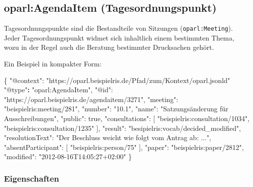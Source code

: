 \documentclass[,a4paper]{article}
\newenvironment{Shaded}{}{}
\newcommand{\DataTypeTok}[1]{\textcolor[rgb]{0.56,0.13,0.00}{{#1}}}
\newcommand{\DecValTok}[1]{\textcolor[rgb]{0.25,0.63,0.44}{{#1}}}
\newcommand{\StringTok}[1]{\textcolor[rgb]{0.25,0.44,0.63}{{#1}}}
\newcommand{\ErrorTok}[1]{\textcolor[rgb]{1.00,0.00,0.00}{\textbf{{#1}}}}
\newcommand{\NormalTok}[1]{{#1}}
\begin{document}
\subsection{oparl:AgendaItem
(Tagesordnungspunkt)}\label{oparlux5fagendaitem}

Tagesordnungspunkte sind die Bestandteile von Sitzungen
(\texttt{oparl:Meeting}). Jeder Tagesordnungspunkt widmet sich
inhaltlich einem bestimmten Thema, wozu in der Regel auch die Beratung
bestimmter Drucksachen gehört.

Ein Beispiel in kompakter Form:

\begin{Shaded}
\begin{Highlighting}[]
\NormalTok{\{}
    \DataTypeTok{"@context"}\NormalTok{: }\StringTok{"https://oparl.beispielris.de/Pfad/zum/Kontext/oparl.jsonld"}
    \StringTok{"@type"}\ErrorTok{:} \StringTok{"oparl:AgendaItem"}\NormalTok{,}
    \DataTypeTok{"@id"}\NormalTok{: }\StringTok{"https://oparl.beispielris.de/agendaitem/3271"}\NormalTok{,}
    \DataTypeTok{"meeting"}\NormalTok{: }\StringTok{"beispielris:meeting/281"}\NormalTok{,}
    \DataTypeTok{"number"}\NormalTok{: }\StringTok{"10.1"}\NormalTok{,}
    \DataTypeTok{"name"}\NormalTok{: }\StringTok{"Satzungsänderung für Ausschreibungen"}\NormalTok{,}
    \DataTypeTok{"public"}\NormalTok{: }\DecValTok{true}\NormalTok{,}
    \DataTypeTok{"consultations"}\NormalTok{: [}
        \StringTok{"beispielris:consultation/1034"}\NormalTok{,}
        \StringTok{"beispielris:consultation/1235"}
    \NormalTok{],}
    \DataTypeTok{"result"}\NormalTok{: }\StringTok{"besipielris:vocab/decided_modified"}\NormalTok{,}
    \DataTypeTok{"resolutionText"}\NormalTok{: }\StringTok{"Der Beschluss weicht wie folgt vom Antrag ab: ..."}\NormalTok{,}
    \DataTypeTok{"absentParticipant"}\NormalTok{: [}
        \StringTok{"beispielris:person/75"}
    \NormalTok{],}
    \DataTypeTok{"paper"}\NormalTok{: }\StringTok{"beispielris:paper/2812"}\NormalTok{,}
    \DataTypeTok{"modified"}\NormalTok{: }\StringTok{"2012-08-16T14:05:27+02:00"}
\NormalTok{\}}
\end{Highlighting}
\end{Shaded}

\subsubsection{Eigenschaften}\label{eigenschaften-5}
\end{document}
